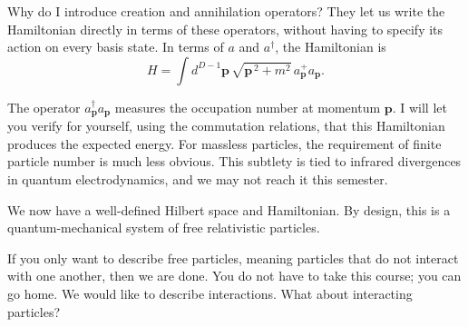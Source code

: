 Why do I introduce creation and annihilation operators? They let us write the
Hamiltonian directly in terms of these operators, without having to specify its
action on every basis state.
In terms of $a$ and $a^\dagger$, the Hamiltonian is
\begin{equation}
  H=\int d^{D-1}\mathbf p\,
  \sqrt{\mathbf p^{\,2}+m^2}\,
  a_{\mathbf p}^{+}a_{\mathbf p}.
  \label{eq:253a-free-hamiltonian}
\end{equation}

The operator $a^\dagger_{\mathbf p}a_{\mathbf p}$ measures the occupation number
at momentum $\mathbf p$. I will let you verify for yourself, using the
commutation relations, that this Hamiltonian produces the expected energy.
For massless particles, the requirement of finite particle number is much less
obvious. This subtlety is tied to infrared divergences in quantum
electrodynamics, and we may not reach it this semester.

We now have a well-defined Hilbert space and Hamiltonian. By design, this is a
quantum-mechanical system of free relativistic particles.

If you only want to describe free particles, meaning particles that do not
interact with one another, then we are done. You do not have to take this
course; you can go home. We would like to describe interactions. What about
interacting particles?

